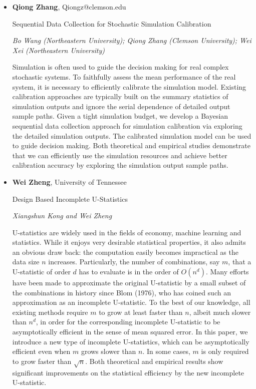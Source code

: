 \begin{itemize}
\item \textbf{Qiong Zhang}, Qiongz@clemson.edu

Sequential Data Collection for Stochastic Simulation Calibration

\emph{\footnotesize Bo Wang (Northeastern University); Qiong Zhang (Clemson University); Wei Xei (Northeastern University)}

Simulation is often used to guide the decision making for real complex stochastic systems. To faithfully assess the mean performance of the real system, it is necessary to efficiently calibrate the simulation model. Existing calibration approaches are typically built on the summary statistics of simulation outputs and ignore the serial dependence of detailed output sample paths. Given a tight simulation budget, we develop a Bayesian sequential data collection approach for simulation calibration via exploring the detailed simulation outputs. The calibrated simulation model can be used to guide decision making. Both theoretical and empirical studies demonstrate that we can efficiently use the simulation resources and achieve better calibration accuracy by exploring the simulation output sample paths.

\item \textbf{Wei Zheng}, University of Tennessee

Design Based Incomplete U-Statistics

\emph{\footnotesize Xiangshun Kong and Wei Zheng}

U-statistics are widely used in the fields of economy, machine learning and statistics. While it enjoys very desirable statistical properties, it also admits an obvious draw back: the computation easily becomes impractical as the data size $n$ increases. Particularly, the number of combinations, say $m$, that a U-statistic of order $d$ has to evaluate is in the order of $O(n^d)$. Many efforts have been made to approximate the original U-statistic by a small subset of the combinations in history since Blom (1976), who has coined such an approximation as an incomplete U-statistic. To the best of our knowledge, all existing methods require $m$ to grow at least faster than $n$, albeit much slower than $n^d$, in order for the corresponding incomplete U-statistic to be asymptotically efficient in the sense of mean squared error. In this paper, we introduce a new type of incomplete U-statistics, which can be asymptotically efficient even when $m$ grows slower than $n$. In some cases, $m$ is only required to grow faster than $\sqrt{n}$. Both theoretical and empirical results show significant improvements on the statistical efficiency by the new incomplete U-statistic. 


\end{itemize}

